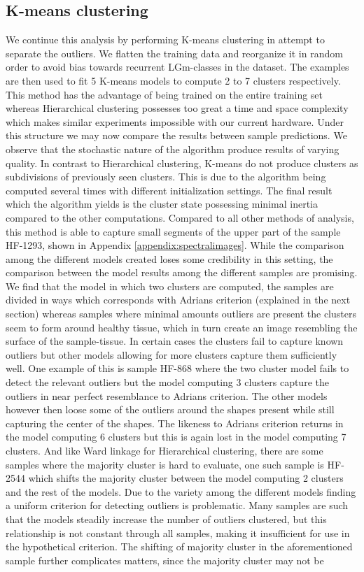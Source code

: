 \subsection{K-means clustering}

We continue this analysis by performing K-means clustering in attempt to separate the outliers. We flatten the training data and reorganize it in random order to avoid bias towards recurrent LGm-classes in the dataset. The examples are then used to fit 5 K-means models to compute 2 to 7 clusters respectively. This method has the advantage of being trained on the entire training set whereas Hierarchical clustering possesses too great a time and space complexity which makes similar experiments impossible with our current hardware. Under this structure we may now compare the results between sample predictions. We observe that the stochastic nature of the algorithm produce results of varying quality. In contrast to Hierarchical clustering, K-means do not produce clusters as subdivisions of previously seen clusters. This is due to the algorithm being computed several times with different initialization settings. The final result which the algorithm yields is the cluster state possessing minimal inertia compared to the other computations. Compared to all other methods of analysis, this method is able to capture small segments of the upper part of the sample HF-1293, shown in Appendix \ref{appendix:spectralimages}. While the comparison among the different models created loses some credibility in this setting, the comparison between the model results among the different samples are promising. We find that the model in which two clusters are computed, the samples are divided in ways which corresponds with Adrians criterion (explained in the next section) whereas samples where minimal amounts outliers are present the clusters seem to form around healthy tissue, which in turn create an image resembling the surface of the sample-tissue. In certain cases the clusters fail to capture known outliers but other models allowing for more clusters capture them sufficiently well. One example of this is sample HF-868 where the two cluster model fails to detect the relevant outliers but the model computing 3 clusters capture the outliers in near perfect resemblance to Adrians criterion. The other models however then loose some of the outliers around the shapes present while still capturing the center of the shapes. The likeness to Adrians criterion returns in the model computing 6 clusters but this is again lost in the model computing 7 clusters. And like Ward linkage for Hierarchical clustering, there are some samples where the majority cluster is hard to evaluate, one such sample is HF-2544 which shifts the majority cluster between the model computing 2 clusters and the rest of the models. Due to the variety among the different models finding a uniform criterion for detecting outliers is problematic. Many samples are such that the models steadily increase the number of outliers clustered, but this relationship is not constant through all samples, making it insufficient for use in the hypothetical criterion. The shifting of majority cluster in the aforementioned sample further complicates matters, since the majority cluster may not be 